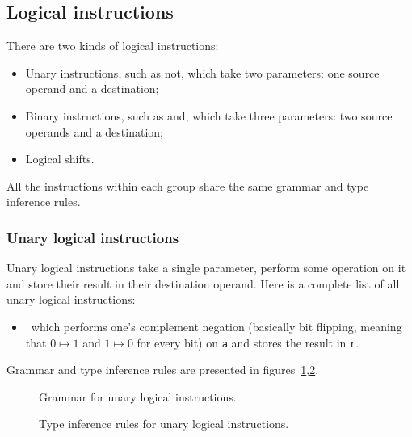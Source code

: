 \subsection{Logical instructions}\label{subsec:nstar-instructionset-registers-logical}

There are two kinds of logical instructions:
\begin{itemize}
	\item Unary instructions, such as {\Iformat not}, which take two parameters: one source operand and a destination;
	\item Binary instructions, such as {\Iformat and}, which take three parameters: two source operands and a destination;
	\item Logical shifts.
\end{itemize}
All the instructions within each group share the same grammar and type inference rules.

\subsubsection{Unary logical instructions}\label{subsubsec:nstar-instructionset-registers-logical-unary}

Unary logical instructions take a single parameter, perform some operation on it and store their result in their destination operand.
Here is a complete list of all unary logical instructions:
\begin{itemize}
	\item {}\ which performs one's complement negation (basically bit flipping, meaning that $0 \mapsto 1$ and $1 \mapsto 0$ for every bit) on \texttt{a} and stores the result in \texttt{r}.
\end{itemize}
Grammar and type inference rules are presented in figures~\ref{fig:nstar-instructionset-registers-logical-unary-grammar},\ref{fig:nstar-instructionset-registers-logical-unary-typerules}.

\begin{figure}[H]
	\centering


	\caption{Grammar for unary logical instructions.}
	\label{fig:nstar-instructionset-registers-logical-unary-grammar}
\end{figure}

\begin{figure}[H]
	\centering


	\caption{Type inference rules for unary logical instructions.}
	\label{fig:nstar-instructionset-registers-logical-unary-typerules}
\end{figure}

